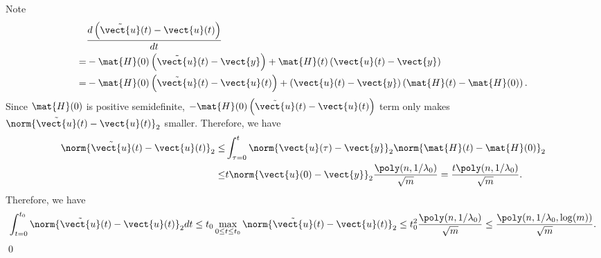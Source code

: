  Note \begin{align*}
 &\frac{d \left(\tilde{\vect{u}}(t)-\vect{u}(t)\right)}{dt} \\
 = &-\mat{H}(0)\left(\tilde{\vect{u}}(t)-\vect{y}\right) + \mat{H}(t)\left(\vect{u}(t)-\vect{y}\right) \\
 = &  -\mat{H}(0)\left(\tilde{\vect{u}}(t)-\vect{u}(t)\right) + \left(\vect{u}(t)-\vect{y}\right)\left(\mat{H}(t)-\mat{H}(0)\right).
 \end{align*}
Since $\mat{H}(0)$ is positive semidefinite, $-\mat{H}(0)\left(\tilde{\vect{u}}(t)-\vect{u}(t)\right) $ term only makes $\norm{\tilde{\vect{u}}(t)-\vect{u}(t)}_2$ smaller.
Therefore, we have \begin{align*}
\norm{\tilde{\vect{u}}(t)-\vect{u}(t)}_2 \le &\int_{\tau =0}^t \norm{\vect{u}(\tau)-\vect{y}}_2 \norm{\mat{H}(t)-\mat{H}(0)}_2 \\
\le & t\norm{\vect{u}(0)-\vect{y}}_2 \frac{\poly(n,1/\lambda_0)}{\sqrt{m}} = \frac{t\poly(n,1/\lambda_0)}{\sqrt{m}} .
\end{align*}
Therefore, we have \begin{align*}
	\int_{t=0}^{t_0}\norm{\tilde{\vect{u}}(t)-\vect{u}(t)}_2 dt \le t_0 \max_{0\le t\le t_0} \norm{\tilde{\vect{u}}(t)-\vect{u}(t)}_2 \le t_0^2 \frac{\poly(n,1/\lambda_0)}{\sqrt{m}} \le \frac{\poly(n,1/\lambda_0,\log(m))}{\sqrt{m}}.
\end{align*}
\qed